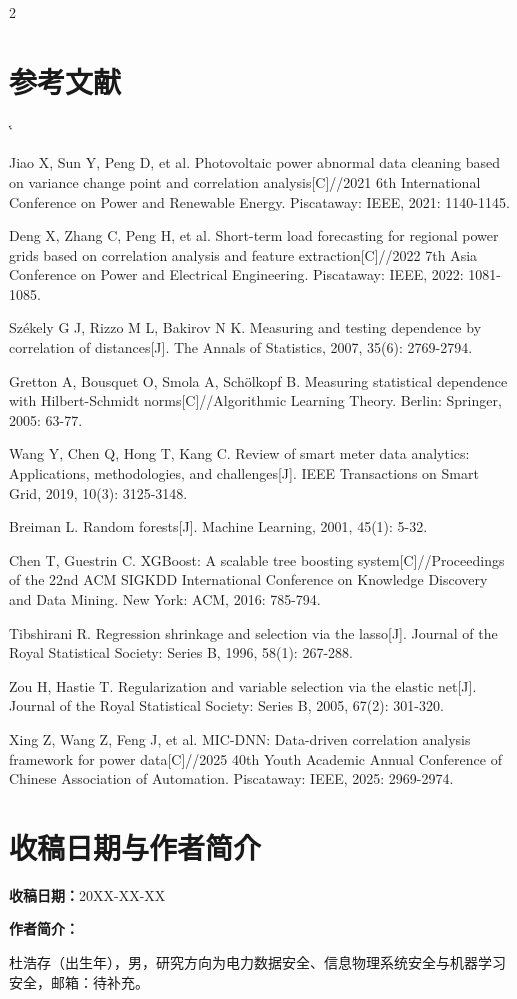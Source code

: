 \documentclass[UTF8,zihao=5,twoside]{ctexart}
\makeatletter
\numberwithin{equation}{section}
\renewcommand{\refname}{参考文献}
\renewenvironment{thebibliography}[1]{%
  \section*{\refname}%
  \small
  \list{[\arabic{enumi}]}{%
    \settowidth\labelwidth{[#1]}%
    \leftmargin\labelwidth
    \advance\leftmargin\labelsep
    \usecounter{enumi}}
  \sloppy\clubpenalty4000\widowpenalty4000\sfcode`\.\@m
}{\def\@noitemerr{\@latex@warning{Empty `thebibliography' environment}}\endlist}
\makeatother
\begin{document}
\begin{multicols}{2}
\begin{thebibliography}{99}
Jiao X, Sun Y, Peng D, et al. Photovoltaic power abnormal data cleaning based on variance change point and correlation analysis[C]//2021 6th International Conference on Power and Renewable Energy. Piscataway: IEEE, 2021: 1140-1145.

Deng X, Zhang C, Peng H, et al. Short-term load forecasting for regional power grids based on correlation analysis and feature extraction[C]//2022 7th Asia Conference on Power and Electrical Engineering. Piscataway: IEEE, 2022: 1081-1085.

Székely G J, Rizzo M L, Bakirov N K. Measuring and testing dependence by correlation of distances[J]. The Annals of Statistics, 2007, 35(6): 2769-2794.

Gretton A, Bousquet O, Smola A, Schölkopf B. Measuring statistical dependence with Hilbert-Schmidt norms[C]//Algorithmic Learning Theory. Berlin: Springer, 2005: 63-77.

Wang Y, Chen Q, Hong T, Kang C. Review of smart meter data analytics: Applications, methodologies, and challenges[J]. IEEE Transactions on Smart Grid, 2019, 10(3): 3125-3148.

Breiman L. Random forests[J]. Machine Learning, 2001, 45(1): 5-32.

Chen T, Guestrin C. XGBoost: A scalable tree boosting system[C]//Proceedings of the 22nd ACM SIGKDD International Conference on Knowledge Discovery and Data Mining. New York: ACM, 2016: 785-794.

Tibshirani R. Regression shrinkage and selection via the lasso[J]. Journal of the Royal Statistical Society: Series B, 1996, 58(1): 267-288.

Zou H, Hastie T. Regularization and variable selection via the elastic net[J]. Journal of the Royal Statistical Society: Series B, 2005, 67(2): 301-320.

Xing Z, Wang Z, Feng J, et al. MIC-DNN: Data-driven correlation analysis framework for power data[C]//2025 40th Youth Academic Annual Conference of Chinese Association of Automation. Piscataway: IEEE, 2025: 2969-2974.
\end{thebibliography}

\section*{收稿日期与作者简介}
\noindent\textbf{收稿日期：}20XX-XX-XX

\noindent\textbf{作者简介：}\par
\noindent 杜浩存（出生年），男，研究方向为电力数据安全、信息物理系统安全与机器学习安全，邮箱：待补充。

\end{multicols}
\end{document}
